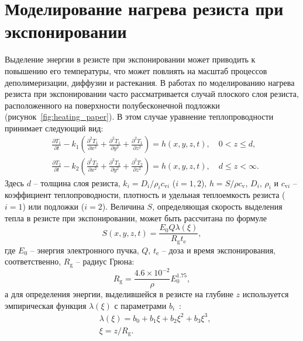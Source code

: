 \section{Моделирование нагрева резиста при экспонировании} \label{sec:sim_heating}

Выделение энергии в резисте при экспонировании может приводить к повышению его температуры, что может повлиять на масштаб процессов деполимеризации, диффузии и растекания. В работах по моделированию нагрева резиста при экспонировании часто рассматривается случай плоского слоя резиста, расположенного на поверхности полубесконечной подложки~\cite{Cui_heating} (рисунок~\ref{fig:heating_paper}). В этом случае уравнение теплопроводности принимает следующий вид:
\begin{equation} \label{eq:heat_diffusion}
	\begin{aligned}
		& \frac{\partial T_1}{\partial t}-k_1\left(\frac{\partial^2 T_1}{\partial x^2}+\frac{\partial^2 T_1}{\partial y^2}+\frac{\partial^2 T_1}{\partial z^2}\right) = h(x, y, z, t), \quad 0 < z \leqslant d, \\
		& \frac{\partial T_2}{\partial t}-k_2\left(\frac{\partial^2 T_2}{\partial x^2}+\frac{\partial^2 T_2}{\partial y^2}+\frac{\partial^2 T_2}{\partial z^2}\right) = h(x, y, z, t), \quad d \leqslant z < \infty.
	\end{aligned}
\end{equation}
Здесь $d$ -- толщина слоя резиста, $k_i = D_i / \rho_i c_{\mathrm{v} i}$ ($i=1,2$), $h=S / \rho c_\mathrm{v}$, $D_i$, $\rho_i$ и $c_{\mathrm{v} i}$  -- коэффициент теплопроводности, плотность и удельная теплоемкость резиста ($i=1$) или подложки ($i=2$). Величина $S$, определяющая скорость выделения тепла в резисте при экспонировании, может быть рассчитана по формуле
\begin{equation}
	S(x, y, z, t)=\frac{E_0 Q \lambda(\xi)}{R_{\mathrm{g}} t_{\mathrm{e}}},
\end{equation}
где $E_0$ -- энергия электронного пучка, $Q$, $t_\mathrm{e}$ -- доза и время экспонирования, соответственно, $R_\mathrm{g}$ -- радиус Грюна:
\begin{equation}
	R_{\mathrm{g}}=\frac{4.6 \times 10^{-2}}{\rho} E_0^{1.75},
\end{equation}
а для определения энергии, выделившейся в резисте на глубине $z$ используется эмпирическая функция $\lambda(\xi)$ с параметрами $b_i$~\cite{Everhart_lambda}:
\begin{equation}
	\begin{aligned}
	& \lambda(\xi) = b_0+b_1 \xi+b_2 \xi^2+b_3 \xi^3, \\
	& \xi=z/R_\mathrm{g}.
	\end{aligned}
\end{equation}

